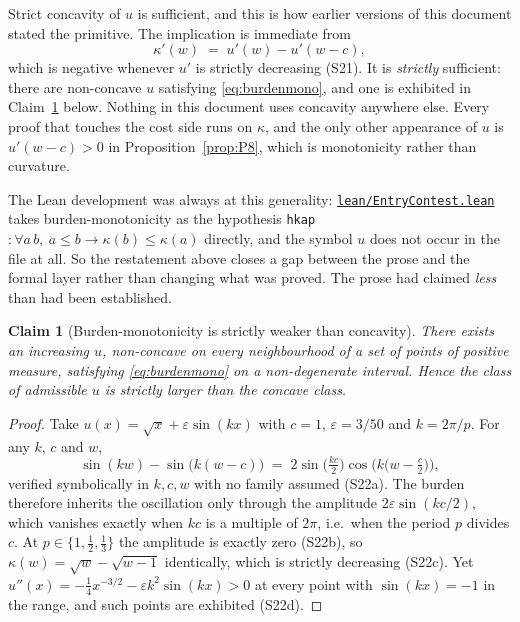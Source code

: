 \documentclass[11pt]{article}
\newtheorem{claim}{Claim}
\newcommand{\file}[1]{\href{run:#1}{\texttt{#1}}}
\begin{document}
Strict concavity of $u$ is sufficient, and this is how earlier versions of
this document stated the primitive. The implication is immediate from
\[
  \kappa'(w) \;=\; u'(w)-u'(w-c),
\]
which is negative whenever $u'$ is strictly decreasing (S21). It is
\emph{strictly} sufficient: there are non-concave $u$ satisfying
\eqref{eq:burdenmono}, and one is exhibited in Claim~\ref{claim:bmweak}
below. Nothing in this document uses concavity anywhere else. Every proof
that touches the cost side runs on $\kappa$, and the only other appearance of
$u$ is $u'(w-c)>0$ in Proposition~\ref{prop:P8}, which is monotonicity rather
than curvature.

The Lean development was always at this generality: \file{lean/EntryContest.lean}
takes burden-monotonicity as the hypothesis
\texttt{hkap}~$:\forall a\,b,\ a\le b\to\kappa(b)\le\kappa(a)$ directly, and
the symbol $u$ does not occur in the file at all. So the restatement above
closes a gap between the prose and the formal layer rather than changing what
was proved. The prose had claimed \emph{less} than had been established.

\begin{claim}[Burden-monotonicity is strictly weaker than concavity]
\label{claim:bmweak}
There exists an increasing $u$, non-concave on every neighbourhood of a set of
points of positive measure, satisfying \eqref{eq:burdenmono} on a non-degenerate
interval. Hence the class of admissible $u$ is strictly larger than the concave
class.
\end{claim}

\begin{proof}
Take $u(x)=\sqrt{x}+\varepsilon\sin(kx)$ with $c=1$, $\varepsilon=3/50$ and
$k=2\pi/p$. For any $k$, $c$ and $w$,
\[
  \sin(kw)-\sin\!\big(k(w-c)\big)
  \;=\; 2\sin\!\Big(\tfrac{kc}{2}\Big)\cos\!\Big(k\big(w-\tfrac{c}{2}\big)\Big),
\]
verified symbolically in $k,c,w$ with no family assumed (S22a). The burden
therefore inherits the oscillation only through the amplitude
$2\varepsilon\sin(kc/2)$, which vanishes exactly when $kc$ is a multiple of
$2\pi$, i.e.\ when the period $p$ divides $c$. At $p\in\{1,\tfrac12,\tfrac13\}$
the amplitude is exactly zero (S22b), so
$\kappa(w)=\sqrt{w}-\sqrt{w-1}$ identically, which is strictly decreasing
(S22c). Yet $u''(x)=-\tfrac14x^{-3/2}-\varepsilon k^2\sin(kx)>0$ at every
point with $\sin(kx)=-1$ in the range, and such points are exhibited (S22d).
\end{proof}
\end{document}
